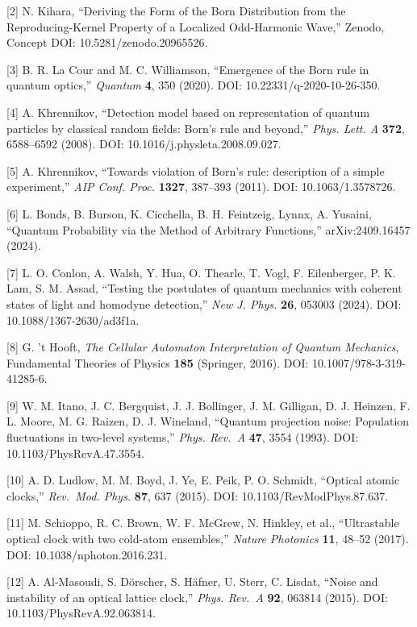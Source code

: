 \documentclass[
]{ltjsarticle}
\begin{document}
{[}2{]} N. Kihara, ``Deriving the Form of the Born Distribution from the
Reproducing-Kernel Property of a Localized Odd-Harmonic Wave,'' Zenodo,
Concept DOI: 10.5281/zenodo.20965526.

{[}3{]} B. R. La Cour and M. C. Williamson, ``Emergence of the Born rule
in quantum optics,'' \emph{Quantum} \textbf{4}, 350 (2020). DOI:
10.22331/q-2020-10-26-350.

{[}4{]} A. Khrennikov, ``Detection model based on representation of
quantum particles by classical random fields: Born's rule and beyond,''
\emph{Phys. Lett. A} \textbf{372}, 6588--6592 (2008). DOI:
10.1016/j.physleta.2008.09.027.

{[}5{]} A. Khrennikov, ``Towards violation of Born's rule: description
of a simple experiment,'' \emph{AIP Conf. Proc.} \textbf{1327}, 387--393
(2011). DOI: 10.1063/1.3578726.

{[}6{]} L. Bonds, B. Burson, K. Cicchella, B. H. Feintzeig, Lynnx, A.
Yusaini, ``Quantum Probability via the Method of Arbitrary Functions,''
arXiv:2409.16457 (2024).

{[}7{]} L. O. Conlon, A. Walsh, Y. Hua, O. Thearle, T. Vogl, F.
Eilenberger, P. K. Lam, S. M. Assad, ``Testing the postulates of quantum
mechanics with coherent states of light and homodyne detection,''
\emph{New J. Phys.} \textbf{26}, 053003 (2024). DOI:
10.1088/1367-2630/ad3f1a.

{[}8{]} G. 't Hooft, \emph{The Cellular Automaton Interpretation of
Quantum Mechanics}, Fundamental Theories of Physics \textbf{185}
(Springer, 2016). DOI: 10.1007/978-3-319-41285-6.

{[}9{]} W. M. Itano, J. C. Bergquist, J. J. Bollinger, J. M. Gilligan,
D. J. Heinzen, F. L. Moore, M. G. Raizen, D. J. Wineland, ``Quantum
projection noise: Population fluctuations in two-level systems,''
\emph{Phys. Rev.~A} \textbf{47}, 3554 (1993). DOI:
10.1103/PhysRevA.47.3554.

{[}10{]} A. D. Ludlow, M. M. Boyd, J. Ye, E. Peik, P. O. Schmidt,
``Optical atomic clocks,'' \emph{Rev.~Mod. Phys.} \textbf{87}, 637
(2015). DOI: 10.1103/RevModPhys.87.637.

{[}11{]} M. Schioppo, R. C. Brown, W. F. McGrew, N. Hinkley, et al.,
``Ultrastable optical clock with two cold-atom ensembles,'' \emph{Nature
Photonics} \textbf{11}, 48--52 (2017). DOI: 10.1038/nphoton.2016.231.

{[}12{]} A. Al-Masoudi, S. Dörscher, S. Häfner, U. Sterr, C. Lisdat,
``Noise and instability of an optical lattice clock,'' \emph{Phys.
Rev.~A} \textbf{92}, 063814 (2015). DOI: 10.1103/PhysRevA.92.063814.
\end{document}
